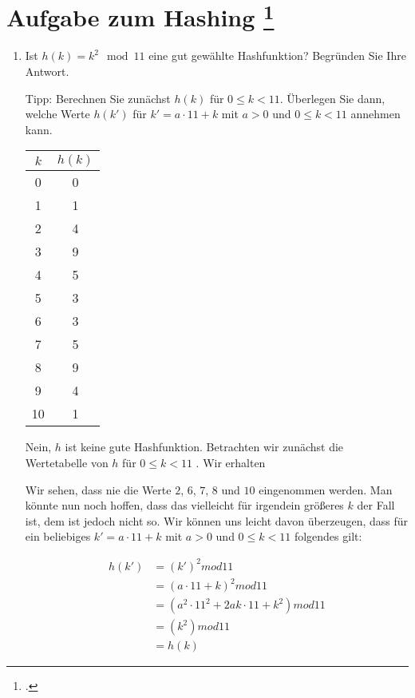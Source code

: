 \documentclass{lehramt-informatik-aufgabe}
\begin{document}

\section{Aufgabe zum Hashing
\footcite[Seite 1]{aud:ab:5}}

\begin{enumerate}


\item Ist $h(k) = k^2 \mod 11$ eine gut gewählte
Hashfunktion? Begründen Sie Ihre Antwort.

Tipp: Berechnen Sie zunächst $h(k)$ für $0 \leq k < 11$. Überlegen Sie
dann, welche Werte $h(k')$ für $k' = a \cdot 11 + k$ mit $a > 0$ und $0
\leq k < 11$ annehmen kann.

\begin{antwort}

\begin{center}
\begin{tabular}{|c|c|}
\hline
$k$ & $h(k)$\\\hline\hline
0 & 0\\\hline
1 & 1\\\hline
2 & 4\\\hline
3 & 9\\\hline
4 & 5\\\hline
5 & 3\\\hline
6 & 3\\\hline
7 & 5\\\hline
8 & 9\\\hline
9 & 4\\\hline
10 & 1\\\hline
\end{tabular}
\end{center}

Nein, $h$ ist keine gute Hashfunktion. Betrachten wir zunächst die
Wertetabelle von $h$ für $0 \leq k < 11$ . Wir erhalten

Wir sehen, dass nie die Werte $2$, $6$, $7$, $8$ und $10$ eingenommen
werden. Man könnte nun noch hoffen, dass das vielleicht für irgendein
größeres $k$ der Fall ist, dem ist jedoch nicht so. Wir können uns
leicht davon überzeugen, dass für ein beliebiges $k' = a \cdot 11 + k$
mit $a > 0$ und $0 \leq k < 11$ folgendes gilt:

\begin{align*}
h(k')
  &= (k')^2 mod 11\\
  &= (a \cdot 11 + k)^2 mod 11\\
  &= (a^2 \cdot 11^2 + 2ak \cdot 11 + k^2) mod 11\\
  &= (k^2) mod 11\\
  &= h(k)
\end{align*}


\end{antwort}
\end{enumerate}
\end{document}
